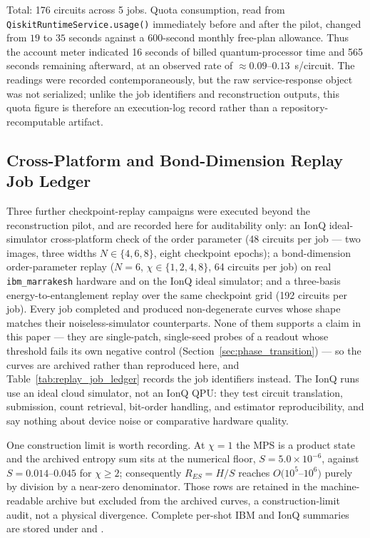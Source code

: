 \documentclass[11pt]{article}
\begin{document}
Total: 176 circuits across 5 jobs. Quota consumption, read from \texttt{QiskitRuntimeService.}\allowbreak\texttt{usage()} immediately before and after the pilot, changed from $19$ to $35$ seconds against a $600$-second monthly free-plan allowance. Thus the account meter indicated 16 seconds of billed quantum-processor time and 565 seconds remaining afterward, at an observed rate of $\approx\!0.09$--$0.13$~s/circuit. The readings were recorded contemporaneously, but the raw service-response object was not serialized; unlike the job identifiers and reconstruction outputs, this quota figure is therefore an execution-log record rather than a repository-recomputable artifact.

\subsection{Cross-Platform and Bond-Dimension Replay Job Ledger}
\label{sec:supp_bond_dimension_hardware}
Three further checkpoint-replay campaigns were executed beyond the reconstruction pilot, and are recorded here for auditability only: an IonQ ideal-simulator cross-platform check of the order parameter (48 circuits per job --- two images, three widths $N\in\{4,6,8\}$, eight checkpoint epochs); a bond-dimension order-parameter replay ($N=6$, $\chi\in\{1,2,4,8\}$, 64 circuits per job) on real \texttt{ibm\_marrakesh} hardware and on the IonQ ideal simulator; and a three-basis energy-to-entanglement replay over the same checkpoint grid (192 circuits per job). Every job completed and produced non-degenerate curves whose shape matches their noiseless-simulator counterparts. None of them supports a claim in this paper --- they are single-patch, single-seed probes of a readout whose threshold fails its own negative control (Section~\ref{sec:phase_transition}) --- so the curves are archived rather than reproduced here, and Table~\ref{tab:replay_job_ledger} records the job identifiers instead. The IonQ runs use an ideal cloud simulator, not an IonQ QPU: they test circuit translation, submission, count retrieval, bit-order handling, and estimator reproducibility, and say nothing about device noise or comparative hardware quality.

One construction limit is worth recording. At $\chi=1$ the MPS is a product state and the archived entropy sum sits at the numerical floor, $S=5.0\times10^{-6}$, against $S=0.014$--$0.045$ for $\chi\geq2$; consequently $R_{ES}=H/S$ reaches $O(10^5$--$10^6)$ purely by division by a near-zero denominator. Those rows are retained in the machine-readable archive but excluded from the archived curves, a construction-limit audit, not a physical divergence. Complete per-shot IBM and IonQ summaries are stored under  and .
\end{document}
